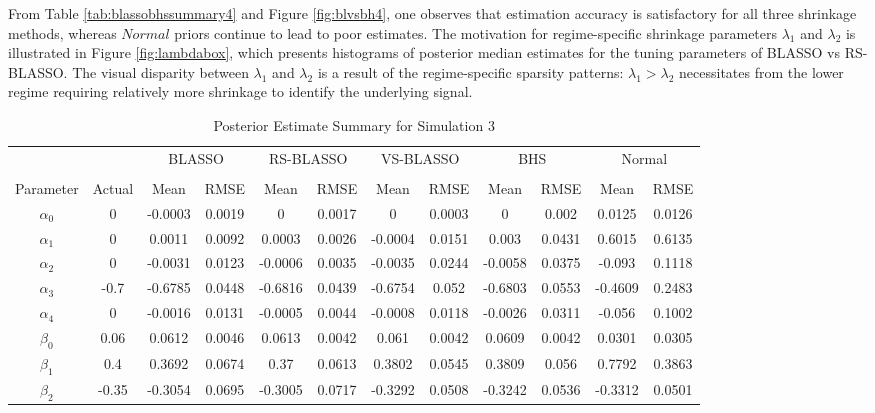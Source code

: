 From Table \ref{tab:blassobhssummary4} and Figure \ref{fig:blvsbh4}, one observes that estimation accuracy is satisfactory for all three shrinkage methods, whereas $Normal$ priors continue to lead to poor estimates. The motivation for regime-specific shrinkage parameters $\lambda_1$ and $\lambda_2$ is illustrated in Figure \ref{fig:lambdabox}, which presents histograms of posterior median estimates for the tuning parameters of BLASSO vs RS-BLASSO. The visual disparity between $\lambda_1$ and $\lambda_2$ is a result of the regime-specific sparsity patterns: $\lambda_1>\lambda_2$ necessitates from the lower regime requiring relatively more shrinkage to identify the underlying signal.

\begin{table}
	\scriptsize
  \centering
  \caption{Posterior Estimate Summary for Simulation 3}
  \begin{tabular}{cccccccccccc}
    \toprule
   & & \multicolumn{2}{c}{BLASSO} &\multicolumn{2}{c}{RS-BLASSO} &\multicolumn{2}{c}{VS-BLASSO}  & \multicolumn{2}{c}{BHS} & \multicolumn{2}{c}{Normal} \\
    \cline{3-4} \cline{5-6} \cline{7-8} \cline{9-10} \cline{11-12}\\
    Parameter & Actual & Mean  & RMSE &  Mean & RMSE & Mean & RMSE & Mean & RMSE & Mean & RMSE   \\
    \midrule
   $\alpha_0$ & 0    & -0.0003 & 0.0019 & 0    & 0.0017 & 0    & 0.0003 & 0    & 0.002 & 0.0125 & 0.0126 \\
    $\alpha_1$ & 0    & 0.0011 & 0.0092 & 0.0003 & 0.0026 & -0.0004 & 0.0151 & 0.003 & 0.0431 & 0.6015 & 0.6135 \\
    $\alpha_2$ & 0    & -0.0031 & 0.0123 & -0.0006 & 0.0035 & -0.0035 & 0.0244 & -0.0058 & 0.0375 & -0.093 & 0.1118 \\
    $\alpha_3$ & -0.7 & -0.6785 & 0.0448 & -0.6816 & 0.0439 & -0.6754 & 0.052 & -0.6803 & 0.0553 & -0.4609 & 0.2483 \\
    $\alpha_4$ & 0    & -0.0016 & 0.0131 & -0.0005 & 0.0044 & -0.0008 & 0.0118 & -0.0026 & 0.0311 & -0.056 & 0.1002 \\
    $\beta_0$ & 0.06 & 0.0612 & 0.0046 & 0.0613 & 0.0042 & 0.061 & 0.0042 & 0.0609 & 0.0042 & 0.0301 & 0.0305 \\
    $\beta_1$ & 0.4  & 0.3692 & 0.0674 & 0.37 & 0.0613 & 0.3802 & 0.0545 & 0.3809 & 0.056 & 0.7792 & 0.3863 \\
    $\beta_2$ & -0.35 & -0.3054 & 0.0695 & -0.3005 & 0.0717 & -0.3292 & 0.0508 & -0.3242 & 0.0536 & -0.3312 & 0.0501 \\

\end{tabular}
\end{table}
